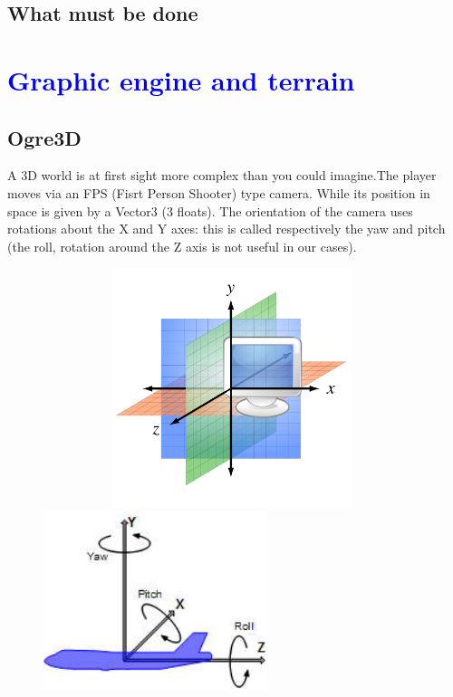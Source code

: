 \documentclass[article]{report} %
\begin{document}
			\section{What must be done}
		\chapter{\textcolor{blue}{Graphic engine and terrain}}
			\section{Ogre3D}
				A 3D world is at first sight more complex than you could imagine.The player moves via an FPS (Fisrt Person Shooter) type camera. While its position in space is given by a Vector3 (3 floats). The orientation of the camera uses rotations about the X and Y axes: this is called respectively the yaw and pitch (the roll, rotation around the Z axis is not useful in our cases).
			\begin{figure}[h]
				\includegraphics[width=11cm,   height=7cm]{Images/axis.png}
				\includegraphics[width=6.5cm]{Images/Rotations.jpeg}
			\end{figure}
			
\end{document}
